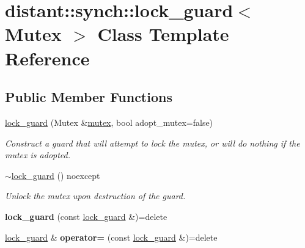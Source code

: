 \hypertarget{classdistant_1_1synch_1_1lock__guard}{}\section{distant\+:\+:synch\+:\+:lock\+\_\+guard$<$ Mutex $>$ Class Template Reference}
\label{classdistant_1_1synch_1_1lock__guard}
\subsection*{Public Member Functions}
\begin{DoxyCompactItemize}
\item 
\mbox{\hyperlink{classdistant_1_1synch_1_1lock__guard_afe37b69ebfc05c1c97eb474cfdf9b4f1}{lock\+\_\+guard}} (Mutex \&\mbox{\hyperlink{classdistant_1_1synch_1_1mutex}{mutex}}, bool adopt\+\_\+mutex=false)
\begin{DoxyCompactList}\small\item\em Construct a guard that will attempt to lock the mutex, or will do nothing if the mutex is adopted. \end{DoxyCompactList}\item 
\mbox{\label{classdistant_1_1synch_1_1lock__guard_a27c4df5411f53f7ba466abe100660dd3}} 
\mbox{\hyperlink{classdistant_1_1synch_1_1lock__guard_a27c4df5411f53f7ba466abe100660dd3}{$\sim$lock\+\_\+guard}} () noexcept
\begin{DoxyCompactList}\small\item\em Unlock the mutex upon destruction of the guard. \end{DoxyCompactList}\item 
\mbox{\label{classdistant_1_1synch_1_1lock__guard_aab05fca878249d4b4ba94b80653ffd59}} 
{\bfseries lock\+\_\+guard} (const \mbox{\hyperlink{classdistant_1_1synch_1_1lock__guard}{lock\+\_\+guard}} \&)=delete
\item 
\mbox{\label{classdistant_1_1synch_1_1lock__guard_aebcc75617792e91eb555f721f3d4e838}} 
\mbox{\hyperlink{classdistant_1_1synch_1_1lock__guard}{lock\+\_\+guard}} \& {\bfseries operator=} (const \mbox{\hyperlink{classdistant_1_1synch_1_1lock__guard}{lock\+\_\+guard}} \&)=delete
\end{DoxyCompactItemize}


